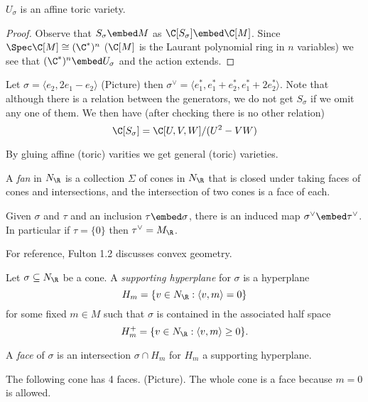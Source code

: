 \documentclass[a4paper]{article}
\begin{document}
\begin{lemma}
  \(U_\sigma\) is an affine toric variety.
\end{lemma}

\begin{proof}
  Observe that \(S_\sigma \embed M\) as \(\C[S_\sigma] \embed \C[M]\). Since \(\Spec \C[M] \cong (\C^*)^n\) (\(\C[M]\) is the Laurant polynomial ring in \(n\) variables) we see that \((\C^*)^n \embed U_\sigma\) and the action extends.
\end{proof}

\begin{eg}
  Let \(\sigma = \langle e_2, 2e_1 - e_2 \rangle\) (Picture) then \(\sigma^\vee = \langle e_1^*, e_1^* + e_2^*, e_1^* + 2e_2^* \rangle\). Note that although there is a relation between the generators, we do not get \(S_\sigma\) if we omit any one of them. We then have (after checking there is no other relation)
  \[
    \C[S_\sigma] = \C[U, V, W]/(U^2 - VW)
  \]
\end{eg}

By gluing affine (toric) varities we get general (toric) varieties.

\begin{definition}[fan]
  A \emph{fan} in \(N_\R\) is a collection \(\Sigma\) of cones in \(N_\R\) that is closed under taking faces of cones and intersections, and the intersection of two cones is a face of each.
\end{definition}

Given \(\sigma\) and \(\tau\) and an inclusion \(\tau \embed \sigma\), there is an induced map \(\sigma^\vee \embed \tau^\vee\). In particular if \(\tau = \{0\}\) then \(\tau^\vee = M_\R\).

For reference, Fulton 1.2 discusses convex geometry.

Let \(\sigma \subseteq N_\R\) be a cone. A \emph{supporting hyperplane} for \(\sigma\) is a hyperplane
\[
  H_m = \{v \in N_\R: \langle v, m \rangle = 0\}
\]
for some fixed \(m \in M\) such that \(\sigma\) is contained in the associated half space
\[
  H_m^+ = \{v \in N_\R: \langle v, m\rangle \geq 0\}.
\]

A \emph{face} of \(\sigma\) is an intersection \(\sigma \cap H_m\) for \(H_m\) a supporting hyperplane.

\begin{eg}
  The following cone has 4 faces. (Picture). The whole cone is a face because \(m = 0\) is allowed.
\end{eg}
\end{document}
